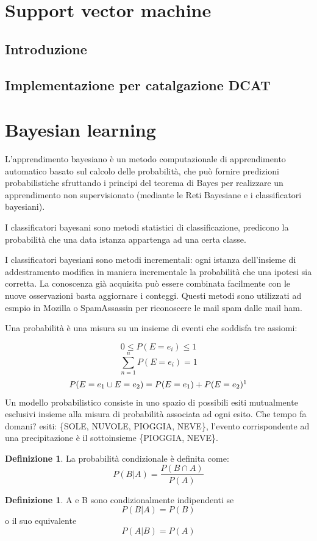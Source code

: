\documentclass{article}
\theoremstyle{plain}
\theoremstyle{definition}
\newtheorem{defn}[]{Definizione} %
\begin{document}
\newpage
\section{Support vector machine}
\subsection{Introduzione}
\subsection{Implementazione per catalgazione DCAT}

\newpage
\section{Bayesian learning}

L'apprendimento bayesiano è un metodo computazionale di apprendimento automatico basato sul calcolo delle probabilità, che può fornire predizioni probabilistiche sfruttando i principi del teorema di Bayes per realizzare un apprendimento non supervisionato (mediante le Reti Bayesiane e i classificatori bayesiani).

 I classificatori bayesani sono metodi statistici di classificazione, predicono la probabilità che una data istanza appartenga ad una certa classe.


I classificatori bayesiani sono metodi incrementali: ogni istanza dell’insieme di addestramento modifica in maniera incrementale la probabilità che una ipotesi sia corretta.
La conoscenza già acquisita può essere combinata facilmente con le nuove osservazioni basta aggiornare i conteggi. Questi metodi sono utilizzati ad esmpio in Mozilla o SpamAssassin per riconoscere le mail spam dalle mail ham.\footnotemark


Una probabilità è una misura su un insieme di eventi che soddisfa tre assiomi:

$$0≤P(E=e_i)≤1$$
$$\sum_{n=1}^{n} P(E=e_i)=1$$
$$P(E=e_1\cup E=e_2)=P(E=e_1)+P(E=e_2)\footnotemark$$
Un modello probabilistico consiste in uno spazio di possibili esiti mutualmente esclusivi insieme alla misura di probabilità associata ad ogni esito.
Che tempo fa domani? esiti: \{SOLE, NUVOLE, PIOGGIA, NEVE\}, l’evento corrispondente ad una precipitazione è il sottoinsieme \{PIOGGIA, NEVE\}.
\begin{defn}
	La probabilità condizionale è definita come: $$P(B|A)=\frac{P(B \cap A)}{P(A)}$$
\end{defn}
\begin{defn}
	A e B sono condizionalmente indipendenti se $$P(B|A)=P(B)$$ o il suo equivalente $$P(A|B)=P(A)$$
\end{defn}
\end{document}
